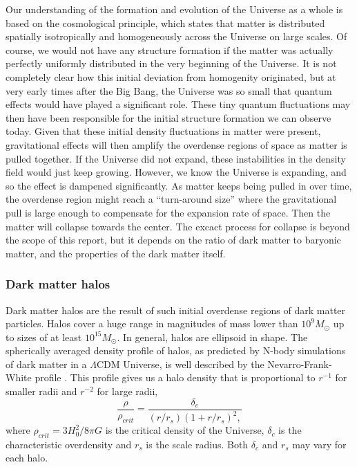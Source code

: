 Our understanding of the formation and evolution of the Universe as a whole is based on the cosmological principle, which states that matter is distributed spatially isotropically and homogeneously across the Universe on large scales. Of course, we would not have any structure formation if the matter was actually perfectly uniformly distributed in the very beginning of the Universe. It is not completely clear how this initial deviation from homogenity originated, but at very early times after the Big Bang, the Universe was so small that quantum effects would have played a significant role. These tiny quantum fluctuations may then have been responsible for the initial structure formation we can observe today. Given that these initial density fluctuations in matter were present, gravitational effects will then amplify the overdense regions of space as matter is pulled together. If the Universe did not expand, these instabilities in the density field would just keep growing. However, we know the Universe is expanding, and so the effect is dampened significantly. As matter keeps being pulled in over time, the overdense region might reach a ``turn-around size'' where the gravitational pull is large enough to compensate for the expansion rate of space. Then the matter will collapse towards the center. The excact process for collapse is beyond the scope of this report, but it depends on the ratio of dark matter to baryonic matter, and the properties of the dark matter itself. 

\subsubsection{Dark matter halos}
Dark matter halos are the result of such initial overdense regions of dark matter particles. Halos cover a huge range in magnitudes of mass lower than $10^9 M_{\odot}$ up to sizes of at least $10^{15} M_{\odot}$. In general, halos are ellipsoid in shape. The spherically averaged density profile of halos, as predicted by N-body simulations of dark matter in a $\Lambda$CDM Universe, is well described by the Nevarro-Frank-White profile \parencite{Navarro1996}. This profile gives us a halo density that is proportional to $r^{-1}$ for smaller radii and $r^{-2}$ for large radii,
\begin{equation}
    \frac{\rho}{\rho_{crit}} = \frac{\delta_c}{(r/r_s)(1+r/r_s)^2,}
\end{equation}
where $\rho_{crit} = 3H_0^2/8\pi G$ is the critical density of the Universe, $\delta_c$ is the characteristic overdensity and $r_s$ is the scale radius. Both $\delta_c$ and $r_s$ may vary for each halo.

